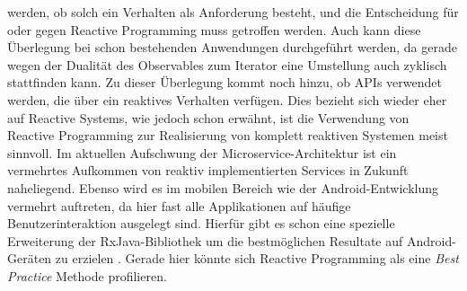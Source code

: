 werden, ob solch ein Verhalten als Anforderung besteht, und die Entscheidung für oder gegen Reactive Programming muss getroffen werden. Auch kann diese Überlegung bei schon bestehenden Anwendungen durchgeführt werden, da gerade wegen der Dualität des Observables zum Iterator eine Umstellung auch zyklisch stattfinden kann. Zu dieser Überlegung kommt noch hinzu, ob APIs verwendet werden, die über ein reaktives Verhalten verfügen. Dies bezieht sich wieder eher auf Reactive Systems, wie jedoch schon erwähnt, ist die Verwendung von Reactive Programming zur Realisierung von komplett reaktiven Systemen meist sinnvoll. Im aktuellen Aufschwung der Microservice-Architektur ist ein vermehrtes Aufkommen von reaktiv implementierten Services in Zukunft naheliegend. Ebenso wird es im mobilen Bereich wie der Android-Entwicklung vermehrt auftreten, da hier fast alle Applikationen auf häufige Benutzerinteraktion ausgelegt sind. Hierfür gibt es schon eine spezielle Erweiterung der RxJava-Bibliothek um die bestmöglichen Resultate auf Android-Geräten zu erzielen \cite{android}. Gerade hier könnte sich Reactive Programming als eine \textit{Best Practice} Methode profilieren.
